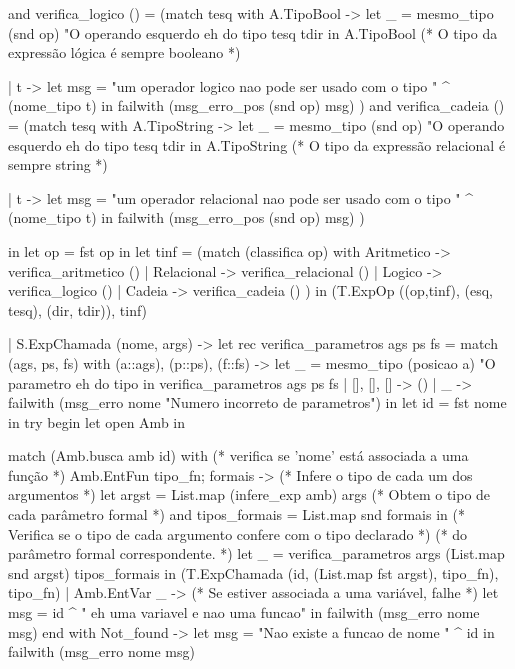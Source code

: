 \documentclass[12pt,a4paper,twoside]{article}
\begin{document}
\begin{terminal}
    and verifica_logico () =
      (match tesq with
         A.TipoBool ->
         let _ = mesmo_tipo (snd op)
                   "O operando esquerdo eh do tipo %
                   tesq tdir
         in A.TipoBool (* O tipo da expressão lógica é sempre booleano *)

       | t -> let msg = "um operador logico nao pode ser usado com o tipo " ^
                        (nome_tipo t)
              in failwith (msg_erro_pos (snd op) msg)
      )
    and verifica_cadeia () =
      (match tesq with
         A.TipoString ->
         let _ = mesmo_tipo (snd op)
                   "O operando esquerdo eh do tipo %
                   tesq tdir
         in A.TipoString (* O tipo da expressão relacional é sempre string *)

       | t -> let msg = "um operador relacional nao pode ser usado com o tipo " ^
                        (nome_tipo t)
              in failwith (msg_erro_pos (snd op) msg)
      )

    in
    let op = fst op in
    let tinf = (match (classifica op) with
          Aritmetico -> verifica_aritmetico ()
        | Relacional -> verifica_relacional ()
        | Logico -> verifica_logico ()
        | Cadeia -> verifica_cadeia ()
      )
    in
      (T.ExpOp ((op,tinf), (esq, tesq), (dir, tdir)), tinf)

  | S.ExpChamada (nome, args) ->
     let rec verifica_parametros ags ps fs =
        match (ags, ps, fs) with
         (a::ags), (p::ps), (f::fs) ->
            let _ = mesmo_tipo (posicao a)
                     "O parametro eh do tipo %
            in verifica_parametros ags ps fs
       | [], [], [] -> ()
       | _ -> failwith (msg_erro nome "Numero incorreto de parametros")
     in
     let id = fst nome in
     try
       begin
         let open Amb in

         match (Amb.busca amb id) with
         (* verifica se 'nome' está associada a uma função *)
           Amb.EntFun {tipo_fn; formais} ->
           (* Infere o tipo de cada um dos argumentos *)
           let argst = List.map (infere_exp amb) args
           (* Obtem o tipo de cada parâmetro formal *)
           and tipos_formais = List.map snd formais in
           (* Verifica se o tipo de cada argumento confere com o tipo declarado *)
           (* do parâmetro formal correspondente.                               *)
           let _ = verifica_parametros args (List.map snd argst) tipos_formais
            in (T.ExpChamada (id, (List.map fst argst), tipo_fn), tipo_fn)
         | Amb.EntVar _ -> (* Se estiver associada a uma variável, falhe *)
           let msg = id ^ " eh uma variavel e nao uma funcao" in
           failwith (msg_erro nome msg)
       end
     with Not_found ->
       let msg = "Nao existe a funcao de nome " ^ id in
       failwith (msg_erro nome msg)


\end{terminal}
\end{document}
